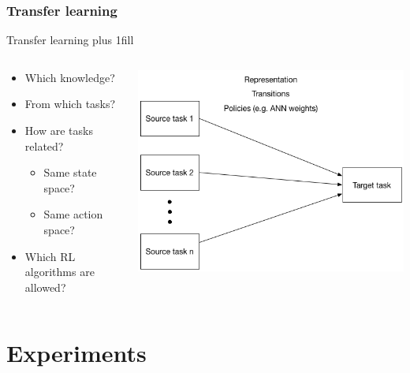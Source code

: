 \documentclass{beamer}
\begin{document}
\section{Transfer learning}
\begin{frame}[fragile]{Transfer learning}
\vskip0pt plus 1fill
\begin{columns}
\begin{column}{0.4\textwidth}
\begin{itemize}
    \item Which knowledge?
    \item From which tasks?
    \item How are tasks related?
    \begin{itemize}
        \item Same state space?
        \item Same action space?
    \end{itemize}
    \item Which RL algorithms are allowed?
\end{itemize}
\end{column}
    \begin{column}{0.6\textwidth}
    \includegraphics[width=\linewidth]{transfer_learning}
    \end{column}
\end{columns}
\begin{center}
\end{center}
\end{frame}

\part{Experiments}
\end{document}
